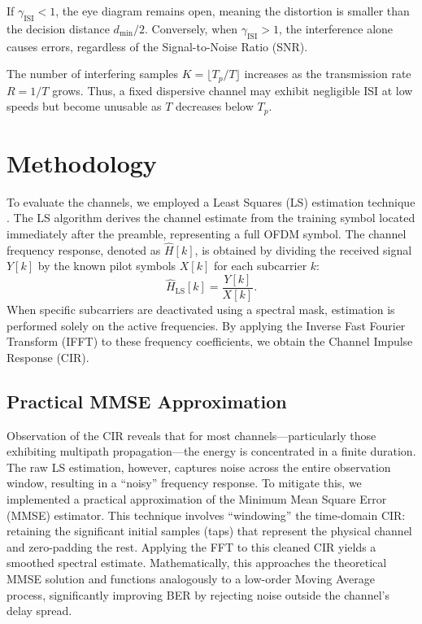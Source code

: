 \begin{remark}
    If $\gamma_{\text{ISI}} < 1$, the eye diagram remains open, meaning the distortion is smaller than the decision distance $d_{\text{min}}/2$. Conversely, when $\gamma_{\text{ISI}} > 1$, the interference alone causes errors, regardless of the Signal-to-Noise Ratio (SNR).
\end{remark}
\begin{Note}
    The number of interfering samples $K = \lfloor T_p / T \rfloor$ increases as the transmission rate $R=1/T$ grows. Thus, a fixed dispersive channel may exhibit negligible ISI at low speeds but become unusable as $T$ decreases below $T_p$.
\end{Note}

\section{Methodology} \label{sec:Methodology}

To evaluate the channels, we employed a Least Squares (LS) estimation technique \autocite{Edfors1998}.
The LS algorithm derives the channel estimate from the training symbol located immediately after the preamble, representing a full OFDM symbol.
The channel frequency response, denoted as $\hat{H}[k]$, is obtained by dividing the received signal $Y[k]$ by the known pilot symbols $X[k]$ for each subcarrier $k$:
\begin{equation}
    \hat{H}_{\text{LS}}[k] = \frac{Y[k]}{X[k]}.
\end{equation}
When specific subcarriers are deactivated using a spectral mask, estimation is performed solely on the active frequencies.
By applying the Inverse Fast Fourier Transform (IFFT) to these frequency coefficients, we obtain the Channel Impulse Response (CIR).

\subsection{Practical MMSE Approximation} \label{sub:PracticalMMSE}

Observation of the CIR reveals that for most channels---particularly those exhibiting multipath propagation---the energy is concentrated in a finite duration.
The raw LS estimation, however, captures noise across the entire observation window, resulting in a \enquote{noisy} frequency response.
To mitigate this, we implemented a practical approximation of the Minimum Mean Square Error (MMSE) estimator.
This technique involves \enquote{windowing} the time-domain CIR: retaining the significant initial samples (taps) that represent the physical channel and zero-padding the rest.
Applying the FFT to this cleaned CIR yields a smoothed spectral estimate.
Mathematically, this approaches the theoretical MMSE solution and functions analogously to a low-order Moving Average process, significantly improving BER by rejecting noise outside the channel's delay spread.

